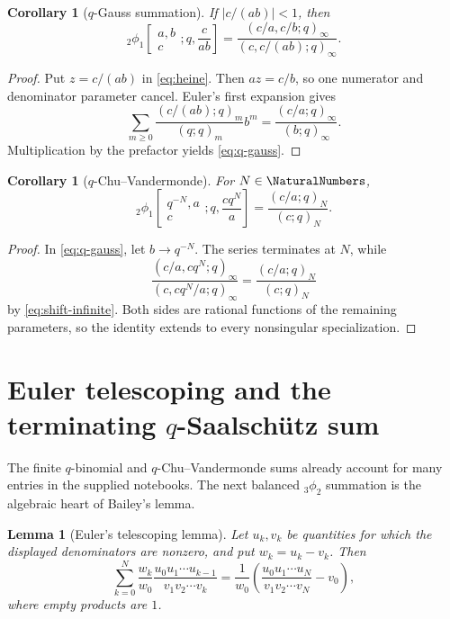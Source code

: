 \documentclass[11pt]{article}
\theoremstyle{blueplain}
\newtheorem{lemma}[theorem]{Lemma}
\newtheorem{corollary}[theorem]{Corollary}
\theoremstyle{bluedef}
\begin{document}
\begin{corollary}[$q$-Gauss summation]\label{cor:q-gauss}
If $|c/(ab)|<1$, then
\begin{equation}\label{eq:q-gauss}
{}_2\phi_1\!\left[\begin{matrix}a,b\\c\end{matrix};q,\frac{c}{ab}\right]
=\frac{(c/a,c/b;q)_\infty}{(c,c/(ab);q)_\infty}.
\end{equation}
\end{corollary}

\begin{proof}
Put $z=c/(ab)$ in \eqref{eq:heine}. Then $az=c/b$, so one numerator and denominator parameter cancel. Euler's first expansion gives
\[
\sum_{m\ge0}\frac{(c/(ab);q)_m}{(q;q)_m}b^m
=\frac{(c/a;q)_\infty}{(b;q)_\infty}.
\]
Multiplication by the prefactor yields \eqref{eq:q-gauss}.
\end{proof}

\begin{corollary}[$q$-Chu--Vandermonde]\label{cor:q-chu}
For $N\in\NaturalNumbers$,
\begin{equation}\label{eq:q-chu}
{}_2\phi_1\!\left[\begin{matrix}q^{-N},a\\c\end{matrix};q,\frac{cq^N}{a}\right]
=\frac{(c/a;q)_N}{(c;q)_N}.
\end{equation}
\end{corollary}

\begin{proof}
In \eqref{eq:q-gauss}, let $b\to q^{-N}$. The series terminates at $N$, while
\[
\frac{(c/a,cq^N;q)_\infty}{(c,cq^N/a;q)_\infty}
=\frac{(c/a;q)_N}{(c;q)_N}
\]
by \eqref{eq:shift-infinite}. Both sides are rational functions of the remaining parameters, so the identity extends to every nonsingular specialization.
\end{proof}

\section{Euler telescoping and the terminating $q$-Saalsch\"utz sum}

The finite $q$-binomial and $q$-Chu--Vandermonde sums already account for many entries in the supplied notebooks.  The next balanced ${}_3\phi_2$ summation is the algebraic heart of Bailey's lemma.

\begin{lemma}[Euler's telescoping lemma]\label{lem:euler-telescope}
Let $u_k,v_k$ be quantities for which the displayed denominators are nonzero, and put $w_k=u_k-v_k$.  Then
\begin{equation}\label{eq:euler-telescope}
\sum_{k=0}^{N}\frac{w_k}{w_0}
 \frac{u_0u_1\cdots u_{k-1}}{v_1v_2\cdots v_k}
=\frac1{w_0}\left(
 \frac{u_0u_1\cdots u_N}{v_1v_2\cdots v_N}-v_0
\right),
\end{equation}
where empty products are $1$.
\end{lemma}
\end{document}
